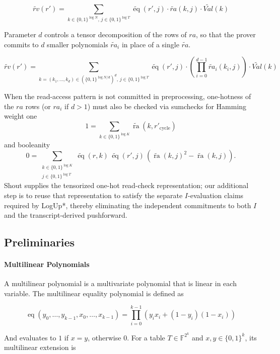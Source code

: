 \[
\widetilde{rv}(r') = 
\sum_{k \in \{0,1\}^{\log N},\, j \in \{0,1\}^{\log T}}
\widetilde{\operatorname{eq}}(r', j) \cdot 
\widetilde{ra}(k, j) \cdot 
\widetilde{Val}(k)
\]

Parameter \(d\) controls a tensor decomposition of the rows of \(ra\), so that the prover commits to 
\(d\) smaller polynomials \(\widetilde{ra}_i\) in place of a single \(\widetilde{ra}\).

\[
\widetilde{rv}(r') = 
\sum_{k=(k_1, \ldots, k_d) \in (\{0,1\}^{\log N / d})^d,\, j \in \{0,1\}^{\log T}}
\widetilde{\operatorname{eq}}(r', j) \cdot 
\left( \prod_{i=0}^{d-1} \widetilde{ra}_i(k_i, j) \right) \cdot 
\widetilde{Val}(k)
\]

When the read-access pattern is not committed in preprocessing, 
one-hotness of the \(ra\) rows (or \(ra_i\) if \(d>1\)) must also be checked
via sumchecks for Hamming weight one
\[
1
=
\sum_{k \in \{0,1\}^{\log K}}
\widetilde{\operatorname{ra}}
\left(
k,
r'_{\mathrm{cycle}}
\right)
\]
and booleanity
\[
0
=
\sum_{\substack{
k \in \{0,1\}^{\log K} \\
j \in \{0,1\}^{\log T}
}}
\widetilde{\operatorname{eq}}(r,k)\,
\widetilde{\operatorname{eq}}(r',j)\,
\left(
\widetilde{\operatorname{ra}}(k,j)^2
-
\widetilde{\operatorname{ra}}(k,j)
\right).
\]
Shout supplies the tensorized one-hot read-check representation; our additional step is to reuse that 
representation to satisfy the separate \(I\)-evaluation claims required by LogUp*, thereby eliminating the 
independent commitments to both \(I\) and the transcript-derived pushforward.

\subsection{Preliminaries}

\paragraph{Multilinear Polynomials}

A multilinear polynomial is a multivariate polynomial that is linear in each variable. 
The multilinear equality polynomial is defined as

$$
\operatorname{eq}(y_0, \dots, y_{k-1}, x_0, \dots, x_{k-1}) = \prod_{i=0}^{k-1} \left(
    y_i x_i + (1 - y_i)(1 - x_i)
\right) 
$$

And evaluates to $1$ if $x=y$, otherwise $0$. For a table $T \in \mathbb{F}^{2^k}$ and $x,y\in\{0,1\}^k$, its 
multilinear extension is 

